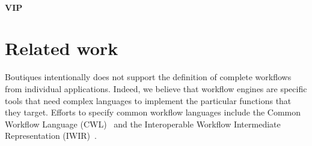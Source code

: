 \documentclass{article}
\begin{document}
\paragraph{VIP}


\section{Related work}

Boutiques intentionally does not support the definition of complete
workflows from individual applications. Indeed, we believe that
workflow engines are specific tools that need complex languages to
implement the particular functions that they target. Efforts to
specify common workflow languages include the Common Workflow Language
(CWL)~\cite{cwl} and the Interoperable Workflow Intermediate
Representation (IWIR)~\cite{plankensteiner2011iwir}.
\end{document}
